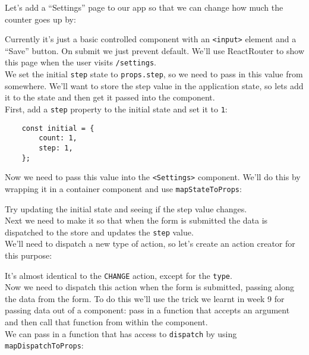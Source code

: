 Let's add a ``Settings'' page to our app so that we can change how much the counter goes up by:


Currently it's just a basic controlled component with an \texttt{<input>} element and a ``Save'' button. On submit we just prevent default. We'll use ReactRouter to show this page when the user visits \texttt{/settings}.
\\

We set the initial \texttt{step} state to \texttt{props.step}, so we need to pass in this value from somewhere. We'll want to store the step value in the application state, so lets add it to the state and then get it passed into the component.
\\

First, add a \texttt{step} property to the initial state and set it to \texttt{1}:

\begin{verbatim}
    const initial = {
        count: 1,
        step: 1,
    };
\end{verbatim}

Now we need to pass this value into the \texttt{<Settings>} component. We'll do this by wrapping it in a container component and use \texttt{mapStateToProps}:


Try updating the initial state and seeing if the step value changes.
\\

Next we need to make it so that when the form is submitted the data is dispatched to the store and updates the \texttt{step} value.
\\

We'll need to dispatch a new type of action, so let's create an action creator for this purpose:


It's almost identical to the \texttt{CHANGE} action, except for the \texttt{type}.
\\

Now we need to dispatch this action when the form is submitted, passing along the data from the form. To do this we'll use the trick we learnt in week 9 for passing data out of a component: pass in a function that accepts an argument and then call that function from within the component.
\\

We can pass in a function that has access to \texttt{dispatch} by using \texttt{mapDispatchToProps}:

